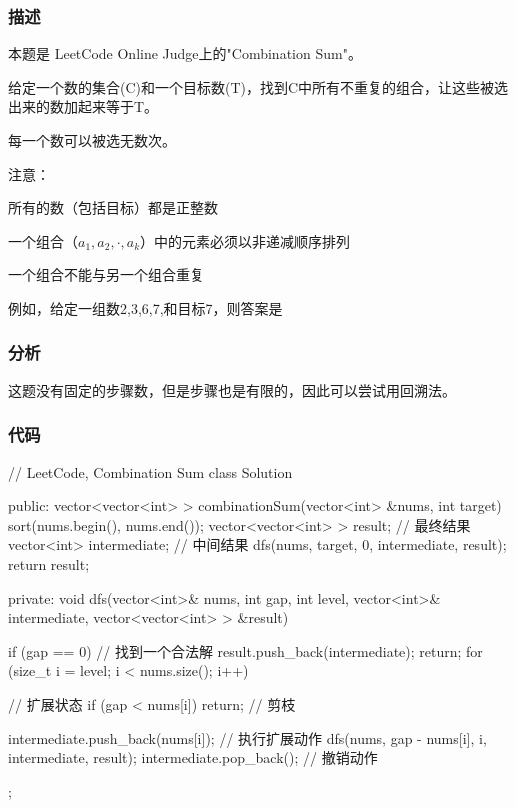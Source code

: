 \subsubsection{描述}
本题是 LeetCode Online Judge上的"Combination Sum"。

给定一个数的集合(C)和一个目标数(T)，找到C中所有不重复的组合，让这些被选出来的数加起来等于T。

每一个数可以被选无数次。

注意：
\begindot
\item 所有的数（包括目标）都是正整数
\item 一个组合（$a_1,a_2,\cdot,a_k$）中的元素必须以非递减顺序排列
\item 一个组合不能与另一个组合重复
\myenddot

例如，给定一组数2,3,6,7,和目标7，则答案是
\begin{Code}
[7]
[2, 2, 3] 
\end{Code}

\subsubsection{分析}
这题没有固定的步骤数，但是步骤也是有限的，因此可以尝试用回溯法。

\subsubsection{代码}

\begin{Codex}[label=combination_sum.cpp]
// LeetCode, Combination Sum
class Solution {
public:
    vector<vector<int> > combinationSum(vector<int> &nums, int target) {
        sort(nums.begin(), nums.end());
        vector<vector<int> > result; // 最终结果
        vector<int> intermediate; // 中间结果
        dfs(nums, target, 0, intermediate, result);
        return result;
    }

private:
    void dfs(vector<int>& nums, int gap, int level, vector<int>& intermediate,
            vector<vector<int> > &result) {
        if (gap == 0) {  // 找到一个合法解
            result.push_back(intermediate);
            return;
        }
        for (size_t i = level; i < nums.size(); i++) { // 扩展状态
            if (gap < nums[i]) return; // 剪枝

            intermediate.push_back(nums[i]); // 执行扩展动作
            dfs(nums, gap - nums[i], i, intermediate, result);
            intermediate.pop_back();  // 撤销动作
        }
    }
};
\end{Codex}


